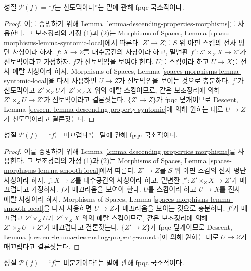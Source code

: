 \begin{lemma}
\label{lemma-descending-property-syntomic}
성질 $\mathcal{P}(f)=$``$f$는 신토믹이다''는 밑에 관해 fpqc 국소적이다.
\end{lemma}

\begin{proof}
이를 증명하기 위해 Lemma \ref{lemma-descending-properties-morphisms}를
사용한다. 그 보조정리의 가정 (1)과 (2)는 Morphisms of Spaces, Lemma
\ref{spaces-morphisms-lemma-syntomic-local}에서 따른다. $Z'\to Z$를 $S$ 위
아핀 스킴의 전사 평탄 사상이라 하자. $f:X\to Z$를 대수공간의 사상이라
하고, 밑변환 $f':Z'\times_ZX\to Z'$가 신토믹이라고 가정하자. $f$가
신토믹임을 보여야 한다. $U$를 스킴이라 하고 $U\to X$를 전사 에탈
사상이라 하자. Morphisms of Spaces, Lemma
\ref{spaces-morphisms-lemma-syntomic-local}을 다시 사용하면 $U\to Z$가
신토믹임을 보이는 것으로 충분하다. $f'$가 신토믹이고 $Z'\times_ZU$가
$Z'\times_ZX$ 위의 에탈 스킴이므로, 같은 보조정리에 의해
$Z'\times_ZU\to Z'$가 신토믹이라고 결론짓는다. $\{Z'\to Z\}$가 fpqc
덮개이므로 Descent, Lemma \ref{descent-lemma-descending-property-syntomic}에
의해 원하는 대로 $U\to Z$가 신토믹이라고 결론짓는다.
\end{proof}

\begin{lemma}
\label{lemma-descending-property-smooth}
성질 $\mathcal{P}(f)=$``$f$는 매끄럽다''는 밑에 관해 fpqc 국소적이다.
\end{lemma}

\begin{proof}
이를 증명하기 위해 Lemma \ref{lemma-descending-properties-morphisms}를
사용한다. 그 보조정리의 가정 (1)과 (2)는 Morphisms of Spaces, Lemma
\ref{spaces-morphisms-lemma-smooth-local}에서 따른다. $Z'\to Z$를 $S$ 위
아핀 스킴의 전사 평탄 사상이라 하자. $f:X\to Z$를 대수공간의 사상이라
하고, 밑변환 $f':Z'\times_ZX\to Z'$가 매끄럽다고 가정하자. $f$가
매끄러움을 보여야 한다. $U$를 스킴이라 하고 $U\to X$를 전사 에탈
사상이라 하자. Morphisms of Spaces, Lemma
\ref{spaces-morphisms-lemma-smooth-local}을 다시 사용하면 $U\to Z$가
매끄러움을 보이는 것으로 충분하다. $f'$가 매끄럽고 $Z'\times_ZU$가
$Z'\times_ZX$ 위의 에탈 스킴이므로, 같은 보조정리에 의해
$Z'\times_ZU\to Z'$가 매끄럽다고 결론짓는다. $\{Z'\to Z\}$가 fpqc
덮개이므로 Descent, Lemma \ref{descent-lemma-descending-property-smooth}에
의해 원하는 대로 $U\to Z$가 매끄럽다고 결론짓는다.
\end{proof}

\begin{lemma}
\label{lemma-descending-property-unramified}
성질 $\mathcal{P}(f)=$``$f$는 비분기이다''는 밑에 관해 fpqc 국소적이다.
\end{lemma}

